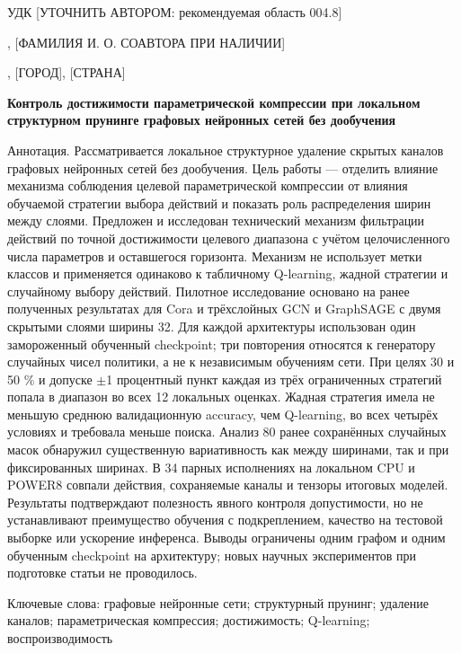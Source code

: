 \documentclass[10pt,a4paper]{article}
\begin{document}
\noindent УДК [УТОЧНИТЬ АВТОРОМ: рекомендуемая область 004.8]\par
{}, [ФАМИЛИЯ И. О. СОАВТОРА ПРИ НАЛИЧИИ]\par
{}, [ГОРОД], [СТРАНА]\par
\begin{center}\bfseries Контроль достижимости параметрической компрессии при локальном структурном прунинге графовых нейронных сетей без дообучения\end{center}
\noindent Аннотация. Рассматривается локальное структурное удаление скрытых каналов графовых нейронных сетей без дообучения. Цель работы — отделить влияние механизма соблюдения целевой параметрической компрессии от влияния обучаемой стратегии выбора действий и показать роль распределения ширин между слоями. Предложен и исследован технический механизм фильтрации действий по точной достижимости целевого диапазона с учётом целочисленного числа параметров и оставшегося горизонта. Механизм не использует метки классов и применяется одинаково к табличному Q-learning, жадной стратегии и случайному выбору действий. Пилотное исследование основано на ранее полученных результатах для Cora и трёхслойных GCN и GraphSAGE с двумя скрытыми слоями ширины 32. Для каждой архитектуры использован один замороженный обученный checkpoint; три повторения относятся к генератору случайных чисел политики, а не к независимым обучениям сети. При целях 30 и 50 \% и допуске $\pm$1 процентный пункт каждая из трёх ограниченных стратегий попала в диапазон во всех 12 локальных оценках. Жадная стратегия имела не меньшую среднюю валидационную accuracy, чем Q-learning, во всех четырёх условиях и требовала меньше поиска. Анализ 80 ранее сохранённых случайных масок обнаружил существенную вариативность как между ширинами, так и при фиксированных ширинах. В 34 парных исполнениях на локальном CPU и POWER8 совпали действия, сохраняемые каналы и тензоры итоговых моделей. Результаты подтверждают полезность явного контроля допустимости, но не устанавливают преимущество обучения с подкреплением, качество на тестовой выборке или ускорение инференса. Выводы ограничены одним графом и одним обученным checkpoint на архитектуру; новых научных экспериментов при подготовке статьи не проводилось.\par
\noindent Ключевые слова: графовые нейронные сети; структурный прунинг; удаление каналов; параметрическая компрессия; достижимость; Q-learning; воспроизводимость\par
\end{document}

